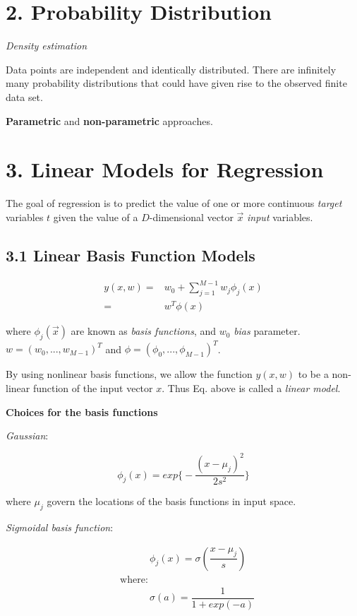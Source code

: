 \documentclass[]{article}
\date{}
\begin{document}
\section{2. Probability Distribution}\label{header-n0}

\emph{Density estimation}

Data points are independent and identically distributed. There are
infinitely many probability distributions that could have given rise to
the observed finite data set.

\textbf{Parametric} and \textbf{non-parametric} approaches.

\section{3. Linear Models for Regression}\label{header-n10}

The goal of regression is to predict the value of one or more continuous
\emph{target} variables \(t\) given the value of a \(D\)-dimensional
vector \(\vec{x}\) \emph{input} variables.

\subsection{3.1 Linear Basis Function Models}\label{header-n13}

\begin{align}
y(x , w)= & w_0+\sum\limits^{M-1}_{j=1}w_j\phi_j(x)\\
=&w^T\phi(x)
\end{align}

where \(\phi_j(\vec{x})\) are known as \emph{basis functions}, and
\(w_0\) \emph{bias} parameter.\\
 \(w=(w_0,...,w_{M-1})^T \) and \(\phi=(\phi_0,...,\phi_{M-1})^T\).

By using nonlinear basis functions, we allow the function \(y(x,w)\) to
be a non-linear function of the input vector \(x\). Thus Eq. above is
called a \emph{linear model}.

\textbf{Choices for the basis functions}

\emph{Gaussian}:

\[\phi_j(x)=exp\Bigg\{-\dfrac{(x-\mu_j)^2}{2s^2}\Bigg\}\]

where \(\mu_j\) govern the locations of the basis functions in input
space.

\emph{Sigmoidal basis function}:

\begin{align}
&\quad\quad\quad\phi_j(x)=\sigma(\dfrac{x-\mu_j}{s})\\
&\text{where: }\\
&\quad\qquad \sigma(a)=\dfrac{1}{1+exp(-a)}
\end{align}
\end{document}

